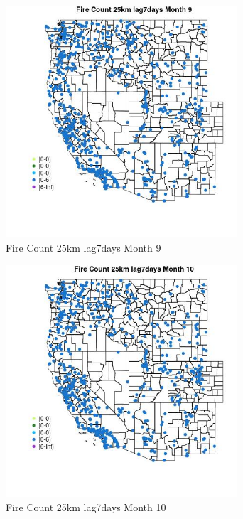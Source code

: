 \begin{figure} 
\centering  
\includegraphics[width=0.77\textwidth]{Code_Outputs/Report_ML_input_PM25_Step4_part_e_de_duplicated_aves_compiled_2019-05-21wNAs_MapObsMo9Fire_Count_25km_lag7days.jpg} 
\caption{\label{fig:Report_ML_input_PM25_Step4_part_e_de_duplicated_aves_compiled_2019-05-21wNAsMapObsMo9Fire_Count_25km_lag7days}Fire Count 25km lag7days Month 9} 
\end{figure} 
 

\begin{figure} 
\centering  
\includegraphics[width=0.77\textwidth]{Code_Outputs/Report_ML_input_PM25_Step4_part_e_de_duplicated_aves_compiled_2019-05-21wNAs_MapObsMo10Fire_Count_25km_lag7days.jpg} 
\caption{\label{fig:Report_ML_input_PM25_Step4_part_e_de_duplicated_aves_compiled_2019-05-21wNAsMapObsMo10Fire_Count_25km_lag7days}Fire Count 25km lag7days Month 10} 
\end{figure} 
 

